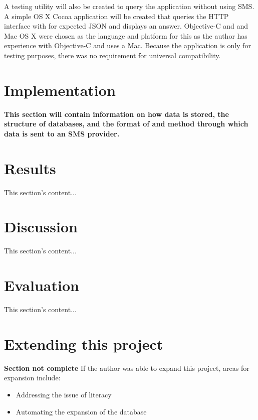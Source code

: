 \documentclass{article}
\begin{document}
A testing utility will also be created to query the application without using SMS.  A simple OS X Cocoa  application will be created that queries the HTTP interface with for expected JSON and displays an answer.  Objective-C and and Mac OS X were chosen as the language and platform for this as the author has experience with Objective-C and uses a Mac.  Because the application is only for testing purposes, there was no requirement for universal compatibility.

\newpage
\section{Implementation}
\label{sec:implementation}
{\bf This section will contain information on how data is stored, the structure of databases, and the format of and method through which data is sent to an SMS provider.}

\newpage
\section{Results}
\label{sec:results}
This section's content...

\newpage
\section{Discussion}
\label{sec:discussion}
This section's content...

\newpage

\newpage
\section{Evaluation}
\label{sec:evaluation}
This section's content...

\newpage

\section{Extending this project}
\label{sec:extending}
{\bf Section not complete} %
If the author was able to expand this project, areas for expansion include:
\begin{itemize}
  \item Addressing the issue of literacy
  \item Automating the expansion of the database
\end{itemize}

\newpage
\end{document}
